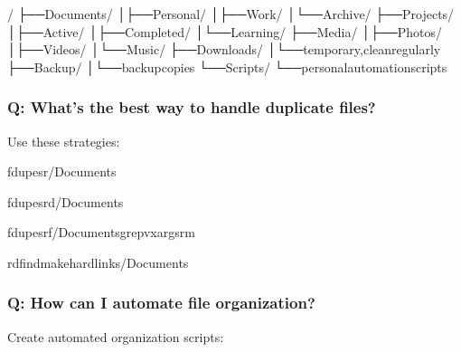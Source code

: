 \documentclass[letterpaper,10pt,english]{sphinxmanual}
\begin{document}
\begin{sphinxVerbatim}[commandchars=\\\{\}]
\PYGZti{}/
├──Documents/
│├──Personal/
│├──Work/
│└──Archive/
├──Projects/
│├──Active/
│├──Completed/
│└──Learning/
├──Media/
│├──Photos/
│├──Videos/
│└──Music/
├──Downloads/
│└──temporary,cleanregularly
├──Backup/
│└──backupcopies
└──Scripts/
└──personalautomationscripts
\end{sphinxVerbatim}


\subsubsection{Q: What’s the best way to handle duplicate files?}
\label{\detokenize{data-organization:q-what-s-the-best-way-to-handle-duplicate-files}}
\sphinxAtStartPar
{} Use these strategies:

\begin{sphinxVerbatim}[commandchars=\\\{\}]
fdupes\PYGZhy{}r\PYGZti{}/Documents

fdupes\PYGZhy{}r\PYGZhy{}d\PYGZti{}/Documents

fdupes\PYGZhy{}r\PYGZhy{}f\PYGZti{}/Documentsgrep\PYGZhy{}vxargsrm

rdfind\PYGZhy{}makehardlinks\PYGZti{}/Documents
\end{sphinxVerbatim}


\subsubsection{Q: How can I automate file organization?}
\label{\detokenize{data-organization:q-how-can-i-automate-file-organization}}
\sphinxAtStartPar
{} Create automated organization scripts:
\end{document}
